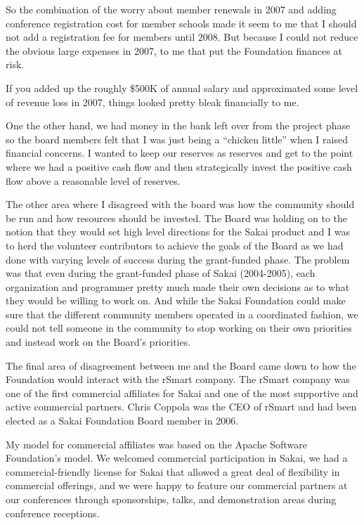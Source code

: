 \documentclass[12pt]{book}
\begin{document}
So the combination of the worry about member renewals in 2007 and adding conference
registration cost for member schools made it seem to me that I should not
add a registration fee for members until 2008.  But because I could not reduce
the obvious large expenses in 2007, to me that put the Foundation finances at risk.

If you added up the roughly \$500K of annual salary and approximated
some level of revenue loss in 2007, things looked pretty bleak financially to me.

One the other hand, we had money in the bank left over from the project phase so
the board members felt that I was just being a ``chicken little'' when I raised
financial concerns.  I wanted to keep our reserves as reserves and get to the point
where we had a positive cash flow and then strategically invest the positive cash
flow above a reasonable level of reserves.

The other area where I disagreed with the board was how the community should be
run and how resources should be invested.  The Board was holding on to the notion that
they would set high level directions for the Sakai product and I was to herd
the volunteer contributors to achieve the goals of the Board as we had done with
varying levels of success during
the grant-funded phase.   The problem was that even during the grant-funded phase
of Sakai (2004-2005), each organization and programmer pretty much made their
own decisions as to what they would be willing to work on.   And while the Sakai
Foundation could make sure that the different community members operated in a
coordinated fashion, we could not tell someone in the community to stop working
on their own priorities and instead work on the Board's priorities.

The final area of disagreement between me and the Board came down to how the
Foundation would interact with the rSmart company.  The rSmart company was one
of the first commercial affiliates for Sakai and one of the most supportive and
active commercial partners.   Chris Coppola was the CEO of rSmart and had been
elected as a Sakai Foundation Board member in 2006.

My model for commercial affiliates was based on the Apache Software Foundation's
model.   We welcomed commercial participation in Sakai, we had a
commercial-friendly license for Sakai that allowed a great deal of flexibility
in commercial offerings, and we were happy to feature our commercial partners
at our conferences through sponsorships, talks, and demonstration areas during
conference receptions.
\end{document}
